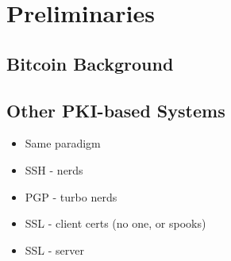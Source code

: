 
\section{Preliminaries}


\subsection{Bitcoin Background}

\subsection{Other PKI-based Systems}
\begin{itemize}
  \item Same paradigm
  \item SSH - nerds
  \item PGP - turbo nerds
  \item SSL - client certs (no one, or spooks)
  \item SSL - server 
\end{itemize}


